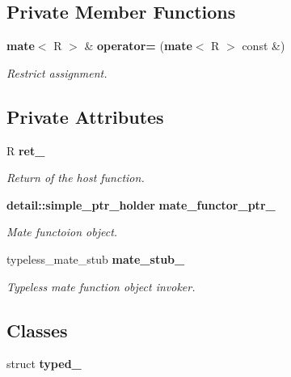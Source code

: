 \subsection*{Private Member Functions}
\begin{CompactItemize}
\item 
{\bf mate}$<$ R $>$ \& {\bf operator=} ({\bf mate}$<$ R $>$ const \&)\label{classam_1_1mate_a2cffaf7bd7a21ba6671e3eb7b7290be}

\begin{CompactList}\small\item\em Restrict assignment. \item\end{CompactList}\end{CompactItemize}
\subsection*{Private Attributes}
\begin{CompactItemize}
\item 
R {\bf ret\_\-}\label{classam_1_1mate_96d8f086acedaaba49fa8dda704c6e68}

\begin{CompactList}\small\item\em Return of the host function. \item\end{CompactList}\item 
{\bf detail::simple\_\-ptr\_\-holder} {\bf mate\_\-functor\_\-ptr\_\-}\label{classam_1_1mate_dac8b8d494662bc0c5cf0a9f0586a465}

\begin{CompactList}\small\item\em Mate functoion object. \item\end{CompactList}\item 
typeless\_\-mate\_\-stub {\bf mate\_\-stub\_\-}\label{classam_1_1mate_72f5837ec74e2e14cdb93f69031b95be}

\begin{CompactList}\small\item\em Typeless mate function object invoker. \item\end{CompactList}\end{CompactItemize}
\subsection*{Classes}
\begin{CompactItemize}
\item 
struct {\bf typed\_\-}
\end{CompactItemize}


